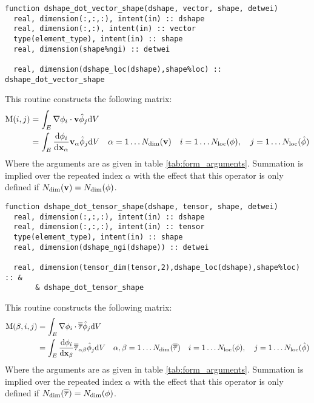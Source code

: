 \documentclass[a4paper, 11pt]{book}
\begin{document}
\begin{lstlisting}
function dshape_dot_vector_shape(dshape, vector, shape, detwei)
  real, dimension(:,:,:), intent(in) :: dshape
  real, dimension(:,:), intent(in) :: vector
  type(element_type), intent(in) :: shape
  real, dimension(shape%ngi) :: detwei

  real, dimension(dshape_loc(dshape),shape%loc) :: dshape_dot_vector_shape
\end{lstlisting}

This routine constructs the following matrix:
\begin{equation}
\begin{split} 
  \mathrm{M}(i,j)&=\int_E \nabla\phi_{i}\cdot\mathbf{v}\hat{\phi}_{j}\mathrm{d} V\\
  &=\int_E \frac{\mathrm{d}\phi_{i}}{\mathrm{d}\mathbf{x}_\alpha}\mathbf{v}_\alpha\hat{\phi}_{j}\mathrm{d} V
  \quad\alpha=1\ldots N_\mathrm{dim}(\mathbf{v})\quad i=1\ldots N_\mathrm{loc}(\phi),\quad
  j=1\ldots N_\mathrm{loc}(\hat{\phi})
\end{split}
\end{equation}
Where the arguments are as given in table
\ref{tab:form_arguments}. Summation is implied over the repeated index
$\alpha$ with the effect that this operator is only defined if $N_\mathrm{dim}(\mathbf{v})=N_\mathrm{dim}(\phi)$.



\begin{lstlisting}
function dshape_dot_tensor_shape(dshape, tensor, shape, detwei)
  real, dimension(:,:,:), intent(in) :: dshape
  real, dimension(:,:,:), intent(in) :: tensor
  type(element_type), intent(in) :: shape
  real, dimension(dshape_ngi(dshape)) :: detwei

  real, dimension(tensor_dim(tensor,2),dshape_loc(dshape),shape%loc) :: &
       & dshape_dot_tensor_shape
\end{lstlisting}

This routine constructs the following matrix:
\begin{equation}
\begin{split} 
  \mathrm{M}(\beta,i,j)&=\int_E \nabla\phi_{i}\cdot\overline{\overline{\tau}}\hat{\phi}_{j}\mathrm{d} V\\
  &=\int_E \frac{\mathrm{d}\phi_{i}}{\mathrm{d}\mathbf{x}_\beta}\overline{\overline{\tau}}_{\alpha\beta}\hat{\phi}_{j}\mathrm{d} V
  \quad\alpha,\beta=1\ldots N_\mathrm{dim}(\overline{\overline{\tau}})\quad i=1\ldots N_\mathrm{loc}(\phi),\quad
  j=1\ldots N_\mathrm{loc}(\hat{\phi})
\end{split}
\end{equation}
Where the arguments are as given in table
\ref{tab:form_arguments}. Summation is implied over the repeated index
$\alpha$ with the effect that this operator is only defined if
$N_\mathrm{dim}(\overline{\overline{\tau}})=N_\mathrm{dim}(\phi)$.
\end{document}
